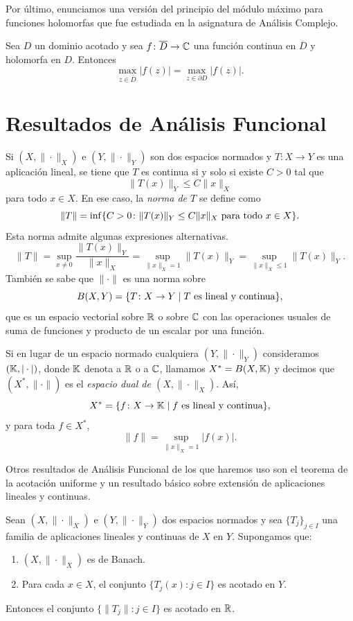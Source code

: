 \documentclass[a4paper, 12pt, oneside]{book}
\begin{document}
Por último, enunciamos una versión del principio del módulo máximo para funciones holomorfas que fue estudiada en la asignatura de Análisis Complejo.

\begin{theorem}\label{1.2.12}
    Sea $D$ un dominio acotado y sea $f \colon \overline{D} \to \mathbb C$ una función continua en $\overline{D}$ y holomorfa en $D$. Entonces
    \[\max_{z\in\overline{D}}|f(z)| = \max_{z \in \partial D}|f(z)|.\]
\end{theorem}



\section{Resultados de Análisis Funcional}

Si $(X,\|\cdot\|_X)$ e $(Y,\|\cdot\|_Y)$ son dos espacios normados y $T \colon X \to Y$ es una aplicación lineal, se tiene que $T$ es continua si y solo si existe $C > 0$ tal que
\[\|T(x)\|_Y \leq C\|x\|_X\]
para todo $x \in X$. En ese caso, la \emph{norma de $T$} se define como
\[\|T\| = \inf\{C > 0 \colon \|T(x)\|_Y \leq C\|x\|_X \textup{ para todo } x \in X\}.\]
Esta norma admite algunas expresiones alternativas.
\[\|T\| = \sup_{x \neq 0} \frac{\|T(x)\|_Y}{\|x\|_X} = \sup_{\|x\|_X = 1} \|T(x)\|_Y = \sup_{\|x\|_X \leq 1} \|T(x)\|_Y.\]
También se sabe que $\|\cdot\|$ es una norma sobre
\[B(X,Y) = \{T \colon X \to Y \mid T \textup{ es lineal y continua}\},\]
que es un espacio vectorial sobre $\mathbb R$ o sobre $\mathbb C$ con las operaciones usuales de suma de funciones y producto de un escalar por una función.

Si en lugar de un espacio normado cualquiera $(Y,\|\cdot\|_Y)$ consideramos $(\mathbb K,|\cdot|)$, donde $\mathbb K$ denota a $\mathbb R$ o a $\mathbb C$, llamamos $X^* = B(X,\mathbb K)$ y decimos que $(X^*,\|\cdot\|)$ es el \emph{espacio dual de $(X,\|\cdot\|_X)$}. Así,
\[X^* = \{f \colon X \to \mathbb K \mid f \textup{ es lineal y continua}\},\]
y para toda $f \in X^*$,
\[\|f\| = \sup_{\|x\|_X=1}|f(x)|.\]

Otros resultados de Análisis Funcional de los que haremos uso son el teorema de la acotación uniforme y un resultado básico sobre extensión de aplicaciones lineales y continuas.

\begin{theorem}\label{1.2.2}
    Sean $(X, \|\cdot\|_X)$ e $(Y,\|\cdot\|_Y)$ dos espacios normados y sea $\{T_j\}_{j \in I}$ una familia de aplicaciones lineales y continuas de $X$ en $Y$. Supongamos que:
    \begin{enumerate}
        \item $(X,\|\cdot\|_X)$ es de Banach.
        \item Para cada $x \in X$, el conjunto $\{T_j(x) \colon j \in I\}$ es acotado en $Y$.
    \end{enumerate}
    Entonces el conjunto $\{\|T_j\| \colon j \in I\}$ es acotado en $\mathbb R$.
\end{theorem}
\end{document}
